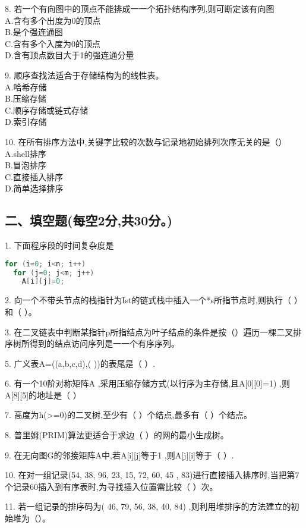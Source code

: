 8. 若一个有向图中的顶点不能排成一一个拓扑结构序列,则可断定该有向图 \\
A.含有多个出度为0的顶点 \\
B.是个强连通图 \\
C.含有多个入度为0的顶点 \\
D.含有顶点数目大于1的强连通分量

9. 顺序查找法适合于存储结构为的线性表。 \\
A.哈希存储 \\
B.压缩存储 \\
C.顺序存储或链式存储 \\
D.索引存储

10. 在所有排序方法中,关键字比较的次数与记录地初始排列次序无关的是（） \\
A.shell排序 \\
B.冒泡排序 \\
C.直接插入排序 \\
D.简单选择排序

\subsection{二、填空题(每空2分,共30分。)}

1. 下面程序段的时间复杂度是
\begin{lstlisting}[language=cpp]
for (i=0; i<n; i++)
  for (j=0; j<m; j++)
    A[i][j]=0;
\end{lstlisting}

2. 向一个不带头节点的栈指针为Ist的链式栈中插入一个*s所指节点时,则执行（   ）和（    ）。

3. 在二叉链表中判断某指针p所指结点为叶子结点的条件是按（）遍历一棵二叉排序树所得到的结点访问序列是一一个有序序列。

5. 广义表A=((a,b,c,d),( ))的表尾是（    ）.

6. 有一个10阶对称矩阵A ,采用压缩存储方式(以行序为主存储,且A[0][0]=1) ,则A[8][5]的地址是（    ）

7. 高度为h(>=0)的二叉树,至少有（    ）个结点,最多有（    ）个结点。

8. 普里姆(PRIM)算法更适合于求边（    ）的网的最小生成树。

9. 在无向图G的邻接矩阵A中,若A[i][j]等于1 ,则A[j][i]等于（    ）.

10. 在对一组记录(54, 38, 96, 23, 15, 72, 60, 45 , 83)进行直接插入排序时,当把第7个记录60插入到有序表时,为寻找插入位置需比较（    ）次。

11. 若一组记录的排序码为( 46, 79, 56, 38, 40, 84) ,则利用堆排序的方法建立的初始堆为（）。


